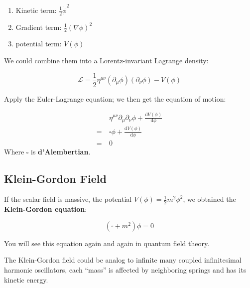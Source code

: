 \documentclass[12pt]{article}
\theoremstyle{mystyle}{\newtheorem{definition}{Definition}[subsection]}
\theoremstyle{mystyle}{\newtheorem{theorem}[definition]{Theorem}}
\theoremstyle{mystyle}{\newtheorem*{remark}{Remark}}
\theoremstyle{mystyle}{\newtheorem{example}{Example}[subsection]}
\theoremstyle{mystyle}{\newtheorem{examples}{Examples}[subsection]}
\theoremstyle{mystyle}{\newtheorem{cthm}{}[subsection]}
\begin{document}
\begin{enumerate}
  \item Kinetic term: \(\frac{1}{2}\dot{\phi}^2\)
  \item Gradient term: \(\frac{1}{2}(\nabla\phi)^2\)
  \item potential term: \(V(\phi)\)
\end{enumerate}
We could combine them into a Lorentz-invariant Lagrange density:
\begin{cthm}
  \[\mathcal{L}= \frac{1}{2}\eta^{\mu\nu}(\partial_{\mu}\phi)(\partial_{\nu}\phi)-V(\phi)\]
\end{cthm}
Apply the Euler-Lagrange equation; we then get the equation of motion:
\begin{cthm}
  \begin{align*}    & \eta^{\mu\nu}\partial_{\mu}\partial_{\nu}\phi+\frac{\mathrm{d}V(\phi)}{\mathrm{d}\phi} \\
              =\  & \square\phi+\frac{\mathrm{d}V(\phi)}{\mathrm{d}\phi}                                   \\
              =\  & 0
  \end{align*}
  Where \(\square\) is \textbf{d'Alembertian}.
\end{cthm}
\subsection{Klein-Gordon Field}
If the scalar field is massive, the potential \(V(\phi)=\frac{1}{2}m^2\phi^2\),
we obtained the \textbf{Klein-Gordon equation}:
\begin{cthm}
  \[(\square +m^2)\phi = 0\]
\end{cthm}
You will see this equation again and again in quantum field theory.
\begin{remark}
  The Klein-Gordon field could be analog to infinite many coupled infinitesimal harmonic oscillators,
  each ``mass'' is affected by neighboring springs and has its kinetic energy.

\end{remark}
\end{document}
